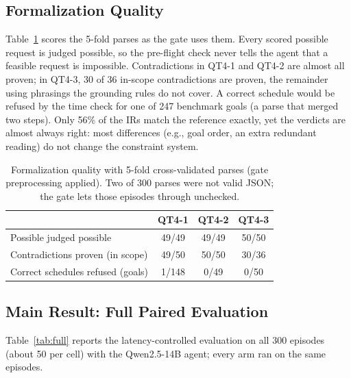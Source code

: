 \documentclass[sigconf]{aamas}
\begin{document}
\subsection{Formalization Quality}

Table~\ref{tab:parser} scores the 5-fold parses as the gate uses them. Every scored possible request is judged
possible, so the pre-flight check never tells the agent that a feasible request is impossible. Contradictions in
QT4-1 and QT4-2 are almost all proven; in QT4-3, 30 of 36 in-scope contradictions are proven, the remainder
using phrasings the grounding rules do not cover. A correct schedule would be refused by the time check for one
of 247 benchmark goals (a parse that merged two steps). Only 56\% of the IRs match the reference exactly, yet the
verdicts are almost always right: most differences (e.g., goal order, an extra redundant reading) do not change
the constraint system.

\begin{table}[t]
  \caption{Formalization quality with 5-fold cross-validated parses (gate preprocessing applied). Two of 300
  parses were not valid JSON; the gate lets those episodes through unchecked.}
  \label{tab:parser}
  \centering\small
  \begin{tabular}{lccc}
    \toprule
     & QT4-1 & QT4-2 & QT4-3 \\
    \midrule
    Possible judged possible & 49/49 & 49/49 & 50/50 \\
    Contradictions proven (in scope) & 49/50 & 50/50 & 30/36 \\
    Correct schedules refused (goals) & 1/148 & 0/49 & 0/50 \\
    \bottomrule
  \end{tabular}
\end{table}

\subsection{Main Result: Full Paired Evaluation}\label{sec:main}

Table~\ref{tab:full} reports the latency-controlled evaluation on all 300 episodes (about 50 per cell) with the
Qwen2.5-14B agent; every arm ran on the same episodes.
\end{document}
